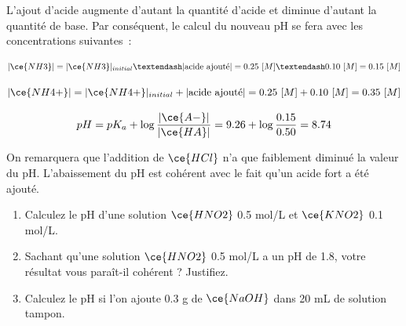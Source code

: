 \documentclass[
  11pt,
  a4paper,
  openany]{book}
\providecommand{\tightlist}{%
  \setlength{\itemsep}{0pt}\setlength{\parskip}{0pt}}
\begin{document}
L'ajout d'acide augmente d'autant la quantité d'acide et diminue d'autant la quantité de base. Par conséquent, le calcul du nouveau pH se fera avec les concentrations suivantes~:

\[
|\ce{NH3}| = |\ce{NH3}|_{initial} – |\text{acide ajouté}| = 0.25\ [M] – 0.10\ [M] = 0.15\ [M]
\]

\[
|\ce{NH4+}| = |\ce{NH4+}|_{initial} + |\text{acide ajouté}| = 0.25\ [M] + 0.10\ [M] = 0.35\ [M]
\]

\[
pH = pK_a + \log \frac{|\ce{A-}|}{|\ce{HA}|} = 9.26 + \log \frac{0.15}{0.50} = 8.74
\]

On remarquera que l'addition de \(\ce{HCl}\) n'a que faiblement diminué la valeur du pH. L'abaissement du pH est cohérent avec le fait qu'un acide fort a été ajouté.

\clearpage

\begin{Exercise}

\begin{enumerate}
\def\labelenumi{\alph{enumi}.}
\tightlist
\item
  Calculez le pH d'une solution \(\ce{HNO2}\) 0.5 mol/L et \(\ce{KNO2}\) 0.1 mol/L.
\item
  Sachant qu'une solution \(\ce{HNO2}\) 0.5 mol/L a un pH de 1.8, votre résultat vous paraît-il cohérent ? Justifiez.
\item
  Calculez le pH si l'on ajoute 0.3 g de \(\ce{NaOH}\) dans 20 mL de solution tampon.
\end{enumerate}

\end{Exercise}
\end{document}
